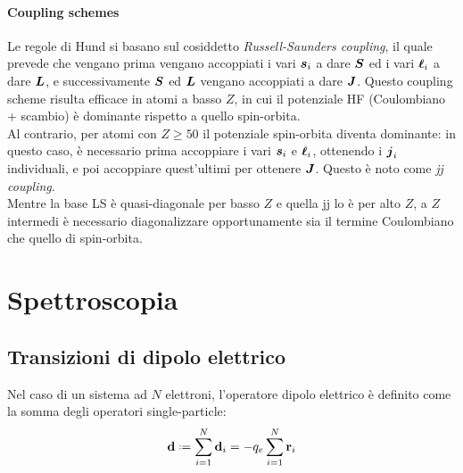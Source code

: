 
\paragraph{Coupling schemes}

Le regole di Hund si basano sul cosiddetto \textit{Russell-Saunders coupling}, il quale prevede che vengano prima vengano accoppiati i vari $ \boldsymbol{s}_i $ a dare $ \boldsymbol{S} $ ed i vari $ \boldsymbol{\ell}_i $ a dare $ \boldsymbol{L} $, e successivamente $ \boldsymbol{S} $ ed $ \boldsymbol{L} $ vengano accoppiati a dare $ \boldsymbol{J} $. Questo coupling scheme risulta efficace in atomi a basso $ Z $, in cui il potenziale HF (Coulombiano + scambio) è dominante rispetto a quello spin-orbita. \\
Al contrario, per atomi con $ Z \ge 50 $ il potenziale spin-orbita diventa dominante\footnotemark: in questo caso, è necessario prima accoppiare i vari $ \boldsymbol{s}_i $ e $ \boldsymbol{\ell}_i $, ottenendo i $ \boldsymbol{j}_i $ individuali, e poi accoppiare quest'ultimi per ottenere $ \boldsymbol{J} $. Questo è noto come \textit{jj coupling}. \\
Mentre la base LS è quasi-diagonale per basso $ Z $ e quella jj lo è per alto $ Z $, a $ Z $ intermedi è necessario diagonalizzare opportunamente sia il termine Coulombiano che quello di spin-orbita.


\section{Spettroscopia}

\subsection{Transizioni di dipolo elettrico}

Nel caso di un sistema ad $ N $ elettroni, l'operatore dipolo elettrico è definito come la somma degli operatori single-particle:
\begin{equation}
	\ve{d} \defeq \sum_{i = 1}^{N} \ve{d}_i = - q_e \sum_{i = 1}^{N} \ve{r}_i
\end{equation}


